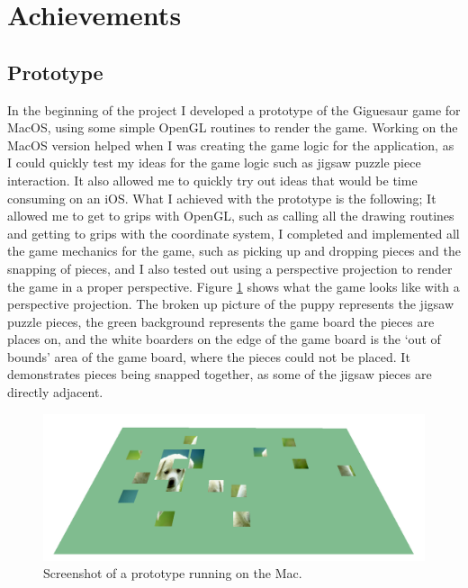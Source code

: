 \documentclass{article}
\begin{document}

\section{Achievements}

\subsection{Prototype}
In the beginning of the project I developed a prototype of the Giguesaur game
for MacOS, using some simple OpenGL routines to render the game. Working on the
MacOS version helped when I was creating the game logic for the application, as
I could quickly test my ideas for the game logic such as jigsaw puzzle piece
interaction. It also allowed me to quickly try out ideas that would be time
consuming on an iOS. What I achieved with the prototype is the following; It
allowed me to get to grips with OpenGL, such as calling all the drawing routines
and getting to grips with the coordinate system, I completed and implemented all
the game mechanics for the game, such as picking up and dropping pieces and the
snapping of pieces, and I also tested out using a perspective projection to
render the game in a proper perspective. Figure \ref{fig:MacBuild} shows what
the game looks like with a perspective projection. The broken up picture of the
puppy \cite{img:OpenGLPuppy} represents the jigsaw puzzle pieces, the green
background represents the game board the pieces are places on, and the white
boarders on the edge of the game board is the `out of bounds' area of the game
board, where the pieces could not be placed. It demonstrates pieces being
snapped together, as some of the jigsaw pieces are directly adjacent.

\begin{figure}[ht]
\begin{center}
\includegraphics[width=1.2\textwidth,center]{images/MacBuildImage}
\caption{Screenshot of a prototype running on the Mac.}
\label{fig:MacBuild}
\end{center}
\end{figure}
\end{document}
